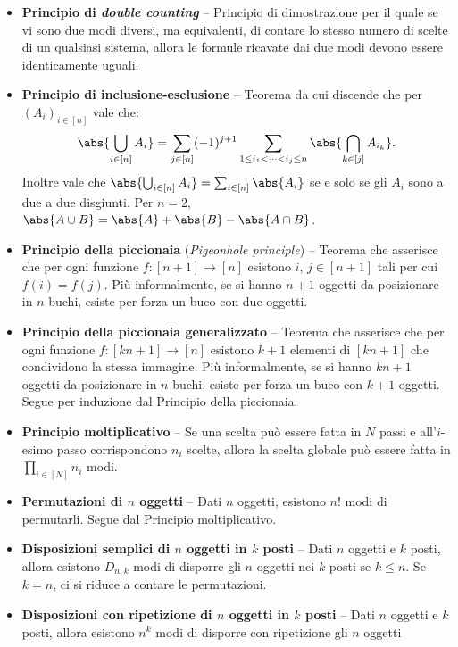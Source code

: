 \begin{multicols*}{2}
\begin{itemize}
    \item \textbf{Principio di \textit{double counting}} -- Principio di dimostrazione per il quale
    se vi sono due modi diversi, ma equivalenti, di contare lo stesso numero di scelte
    di un qualsiasi sistema, allora le formule ricavate dai due modi devono
    essere identicamente uguali.
    \item \textbf{Principio di inclusione-esclusione} -- Teorema da cui discende che per $(A_i)_{i \in [n]}$ vale che: \[\abs{\bigcup_{i \in [n]} A_i} = \sum_{j \in [n]} (-1)^{j+1} \sum_{1 \leq i_1 < \cdots < i_j \leq n} \abs{\bigcap_{k \in [j]} A_{i_k}}.\]
    Inoltre vale che $\abs{\bigcup_{i \in [n]} A_i} = \sum_{i \in [n]} \abs{A_i}$ se e solo se gli $A_i$ sono a due a due disgiunti. Per $n = 2$,
    $\abs{A \cup B} = \abs{A} + \abs{B} - \abs{A \cap B}$.
    \item \textbf{Principio della piccionaia} (\textit{Pigeonhole principle}) -- Teorema che
    asserisce che per ogni funzione $f : [n+1] \to [n]$ esistono $i$, $j \in [n+1]$
    tali per cui $f(i) = f(j)$. Più informalmente, se si hanno $n+1$ oggetti da
    posizionare in $n$ buchi, esiste per forza un buco con due oggetti.
    \item \textbf{Principio della piccionaia generalizzato} -- Teorema che asserisce che
    per ogni funzione $f : [kn+1] \to [n]$ esistono $k+1$ elementi di $[kn+1]$ che
    condividono la stessa immagine. Più informalmente, se si hanno $kn+1$ oggetti
    da posizionare in $n$ buchi, esiste per forza un buco con $k+1$ oggetti. Segue per
    induzione dal Principio della piccionaia.
    \item \textbf{Principio moltiplicativo} -- Se una scelta può essere fatta in $N$
    passi e all'$i$-esimo passo corrispondono $n_i$ scelte, allora la scelta globale
    può essere fatta in $\prod_{i \in [N]} n_i$ modi.
    \item \textbf{Permutazioni di $n$ oggetti} -- Dati $n$ oggetti, esistono
    $n!$ modi di permutarli. Segue dal Principio moltiplicativo.
    \item \textbf{Disposizioni semplici di $n$ oggetti in $k$ posti} -- Dati $n$ oggetti
    e $k$ posti, allora esistono $D_{n,k}$ modi di disporre gli $n$ oggetti nei
    $k$ posti se $k \leq n$. Se $k = n$, ci si riduce a contare le permutazioni.
    \item \textbf{Disposizioni con ripetizione di $n$ oggetti in $k$ posti} -- Dati
    $n$ oggetti e $k$ posti, allora esistono $n^k$ modi di disporre con ripetizione gli $n$ oggetti

\end{itemize}
\end{multicols*}
